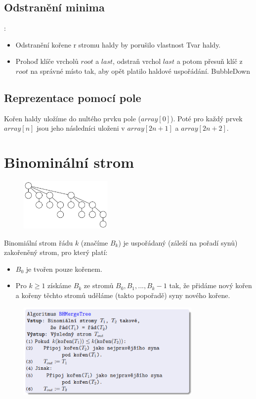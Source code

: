 \documentclass{szzclass}
\begin{document}
\subsection{Odstranění minima}:
\begin{itemize}
    \item Odstranění kořene r stromu haldy by porušilo vlastnost Tvar haldy.
    \item Prohoď klíče vrcholů $root$ a $last$, odstraň vrchol $last$ a potom přesuň klíč z $root$ na správné místo tak, aby opět platilo haldové uspořádání. BubbleDown
\end{itemize}

\subsection{Reprezentace pomocí pole}
Kořen haldy uložíme do nultého prvku pole ($array[0]$). Poté pro každý prvek $array[n]$ jsou jeho následníci uloženi v $array[2n+1]$ a $array[2n+2]$.


\section{Binominální strom}

\begin{figure}[h]
\centering
\includegraphics[width=0.4\textwidth]{topics/bi-spol-5/images/binominal-tree.PNG}
\end{figure}

Binomiální strom řádu $k$ (značíme $B_k$) je uspořádaný (záleží na
pořadí synů) zakořeněný strom, pro který platí:
\begin{itemize}
    \item $B_0$ je tvořen pouze kořenem.
    \item Pro $k \geq 1$ získáme $B_k$ ze stromů $B_0, B_1, . . . , B_k−1$ tak, že
    přidáme nový kořen a kořeny těchto stromů uděláme (takto
    popořadě) syny nového kořene.
\end{itemize}

\begin{figure}[h!]
\centering
\includegraphics[width=0.8\textwidth]{topics/bi-spol-5/images/BHMerge.png}
\end{figure}
\end{document}
